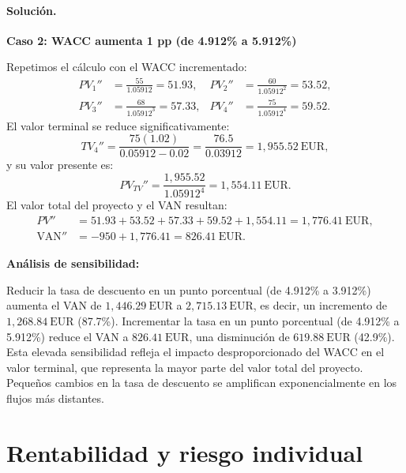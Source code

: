 \documentclass[12pt,a4paper]{article}
\newcommand{\EUR}[1]{\ensuremath{#1~\text{EUR}}}
\newenvironment{solucion}{\paragraph{Solución.}}{}
\begin{document}
\begin{solucion}
\begin{enumerate}[label=\alph*)]
\textbf{Caso 2: WACC aumenta 1 pp (de 4.912\% a 5.912\%)}

Repetimos el cálculo con el WACC incrementado:
\begin{align*}
PV_1'' &= \frac{55}{1.05912} = 51.93, &
PV_2'' &= \frac{60}{1.05912^2} = 53.52,\\[-2pt]
PV_3'' &= \frac{68}{1.05912^3} = 57.33, &
PV_4'' &= \frac{75}{1.05912^4} = 59.52.
\end{align*}
El valor terminal se reduce significativamente:
\[
TV_4'' = \frac{75(1.02)}{0.05912-0.02} = \frac{76.5}{0.03912} = \EUR{1{,}955.52},
\]
y su valor presente es:
\[
PV_{TV}'' = \frac{1{,}955.52}{1.05912^4} = \EUR{1{,}554.11}.
\]
El valor total del proyecto y el VAN resultan:
\begin{align*}
PV'' &= 51.93 + 53.52 + 57.33 + 59.52 + 1{,}554.11 = \EUR{1{,}776.41},\\
\text{VAN}'' &= -950 + 1{,}776.41 = \EUR{826.41}.
\end{align*}

\textbf{Análisis de sensibilidad:}

Reducir la tasa de descuento en un punto porcentual (de 4.912\% a 3.912\%) aumenta el VAN de \EUR{1{,}446.29} a \EUR{2{,}715.13}, es decir, un incremento de \EUR{1{,}268.84} (87.7\%). Incrementar la tasa en un punto porcentual (de 4.912\% a 5.912\%) reduce el VAN a \EUR{826.41}, una disminución de \EUR{619.88} (42.9\%). Esta elevada sensibilidad refleja el impacto desproporcionado del WACC en el valor terminal, que representa la mayor parte del valor total del proyecto. Pequeños cambios en la tasa de descuento se amplifican exponencialmente en los flujos más distantes.
\end{enumerate}
\end{solucion}

\section{Rentabilidad y riesgo individual}
\end{document}

